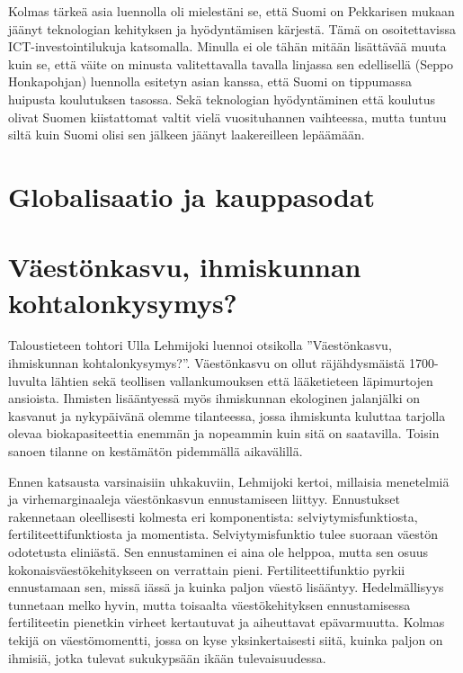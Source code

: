 \documentclass[12pt]{article}
\begin{document}
Kolmas tärkeä asia luennolla oli mielestäni se, että Suomi on Pekkarisen mukaan jäänyt teknologian kehityksen ja hyödyntämisen kärjestä. Tämä on osoitettavissa ICT-investointilukuja katsomalla. Minulla ei ole tähän mitään lisättävää muuta kuin se, että väite on minusta valitettavalla tavalla linjassa sen edellisellä (Seppo Honkapohjan) luennolla esitetyn asian kanssa, että Suomi on tippumassa huipusta koulutuksen tasossa. Sekä teknologian hyödyntäminen että koulutus olivat Suomen kiistattomat valtit vielä vuosituhannen vaihteessa, mutta tuntuu siltä kuin Suomi olisi sen jälkeen jäänyt laakereilleen lepäämään.


\newpage
\section{Globalisaatio ja kauppasodat} %


\newpage
\section{Väestönkasvu, ihmiskunnan kohtalonkysymys?}

Taloustieteen tohtori Ulla Lehmijoki luennoi otsikolla ''Väestönkasvu, ihmiskunnan kohtalonkysymys?''. Väestönkasvu on ollut räjähdysmäistä 1700-luvulta lähtien sekä teollisen vallankumouksen että lääketieteen läpimurtojen ansioista. Ihmisten lisääntyessä myös ihmiskunnan ekologinen jalanjälki on kasvanut ja nykypäivänä olemme tilanteessa, jossa ihmiskunta kuluttaa tarjolla olevaa biokapasiteettia enemmän ja nopeammin kuin sitä on saatavilla. Toisin sanoen tilanne on kestämätön pidemmällä aikavälillä.

Ennen katsausta varsinaisiin uhkakuviin, Lehmijoki kertoi, millaisia menetelmiä ja virhemarginaaleja väestönkasvun ennustamiseen liittyy. Ennustukset rakennetaan oleellisesti kolmesta eri komponentista: selviytymisfunktiosta, fertiliteettifunktiosta ja momentista. Selviytymisfunktio tulee suoraan väestön odotetusta eliniästä. Sen ennustaminen ei aina ole helppoa, mutta sen osuus kokonaisväestökehitykseen on verrattain pieni. Fertiliteettifunktio pyrkii ennustamaan sen, missä iässä ja kuinka paljon väestö lisääntyy. Hedelmällisyys tunnetaan melko hyvin, mutta toisaalta väestökehityksen ennustamisessa fertiliteetin pienetkin virheet kertautuvat ja aiheuttavat epävarmuutta. Kolmas tekijä on väestömomentti, jossa on kyse yksinkertaisesti siitä, kuinka paljon on ihmisiä, jotka tulevat sukukypsään ikään tulevaisuudessa.
\end{document}
